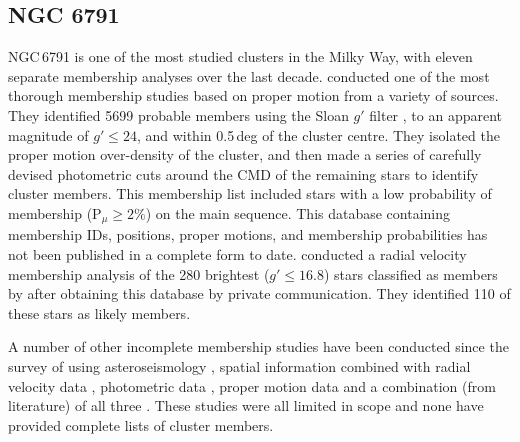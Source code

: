 


\subsection{NGC 6791}

NGC\,6791 is one of the most studied clusters in the Milky Way, with eleven separate membership analyses over the last decade. \cite{platais_new_2011} conducted one of the most thorough membership studies based on proper motion from a variety of sources. They identified 5699 probable members using the Sloan $g'$ filter \citep{fukugita_sloan_1996}, to an apparent magnitude of $g'\leq 24$, and within 0.5\,deg of the cluster centre. They isolated the proper motion over-density of the cluster, and then made a series of carefully devised photometric cuts around the CMD of the remaining stars to identify cluster members. This membership list included stars with a low probability of membership (P$_\mu \geq 2\%$) on the main sequence. This database containing membership IDs, positions, proper motions, and membership probabilities has not been published in a complete form to date. \cite{tofflemire_wiyn_2014} conducted a radial velocity membership analysis of the 280 brightest ($g' \leq 16.8$) stars classified as members by \cite{platais_new_2011} after obtaining this database by private communication. They identified 110 of these stars as likely members.

A number of other incomplete membership studies have been conducted since the survey of \cite{platais_new_2011} using asteroseismology \citep{stello_asteroseismic_2011, bellamy_using_2015}, spatial information combined with radial velocity data \citep{gao_study_2012}, photometric data \citep{carraro_ub_2013, xin-hua_new_2014}, proper motion data \citep{dias_proper_2014,dias_update_2018,castro-ginard_new_2018} and a combination (from literature) of all three \citep{kharchenko_global_2013}. These studies were all limited in scope and none have provided complete lists of cluster members.

